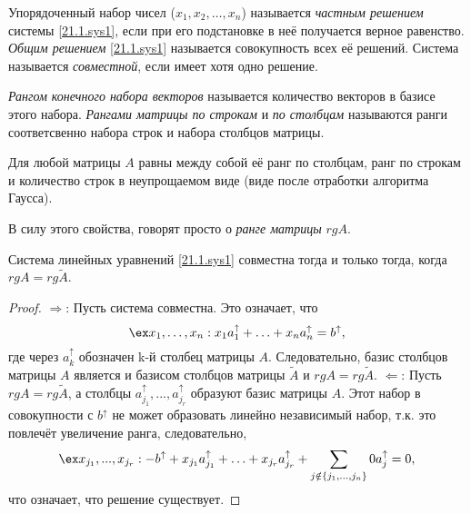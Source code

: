   \begin{defn}
  Упорядоченный набор чисел ($x_1, x_2, \ldots, x_n$) называется \textit{частным решением} системы \ref{21.1.sys1}, если при его подстановке в неё получается верное равенство. \textit{Общим решением} \ref{21.1.sys1} называется совокупность всех её решений. Система называется \textit{совместной}, если имеет хотя одно решение.
  \end{defn}
  \begin{defn}
  \textit{Рангом конечного набора векторов} называется количество векторов в базисе этого набора. \textit{Рангами матрицы по строкам} и \textit{по столбцам} называются ранги соответсвенно набора строк и набора столбцов матрицы.
  \end{defn}
  \begin{lemm} 
  Для любой матрицы $A$ равны между собой её ранг по столбцам, ранг по строкам и количество строк в неупрощаемом виде (виде после отработки алгоритма Гаусса).
  \end{lemm}
  В силу этого свойства, говорят просто о \textit{ранге матрицы} $rg A$.
  \begin{thm}
  Система линейных уравнений \ref{21.1.sys1} совместна тогда и только тогда, когда $rg A = rg \widetilde A$.
  \end{thm}
  \begin{proof}
  $\Rightarrow$: Пусть система совместна. Это означает, что
  \begin{equation*}
  \ex x_1,\ldots, x_n: x_1a_1^\uparrow +\ldots+x_na_n^\uparrow=b^\uparrow,
  \end{equation*}
  где через $a_k^\uparrow$ обозначен k-й столбец матрицы $A$. Следовательно, базис столбцов матрицы $A$  является и базисом столбцов матрицы $\widetilde A$ и $rg A = rg \widetilde A$.
  $\Leftarrow$: Пусть $rg A = rg \widetilde A$, а столбцы $a_{j_1}^\uparrow,...,a_{j_r}^\uparrow$ образуют базис матрицы $A$. Этот набор в совокупности с $b^\uparrow$ не может образовать линейно независимый набор, т.к. это повлечёт увеличение ранга, следовательно, 
  \begin{equation*}\\ 
  \ex x_{j_1},...,x_{j_r}: -b^\uparrow+x_{j_1}a_{j_1}^\uparrow+\ldots+x_{j_r}a_{j_r}^\uparrow+\sum_{j \notin \{j_1,...,j_n\}}0 a_j^\uparrow = 0,
  \end{equation*} 
  что означает, что решение существует.
  \end{proof}
